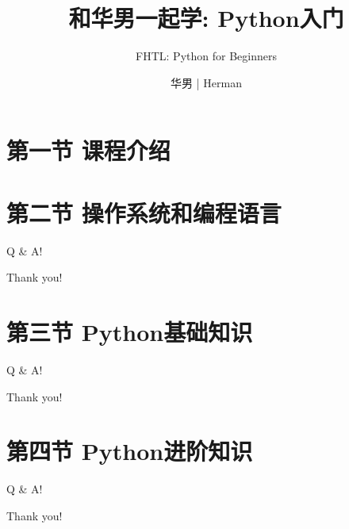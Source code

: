 \documentclass{beamer}
\title{
    和华男一起学: Python入门
    }
\subtitle{
    FHTL: Python for Beginners
    }
\date{}
\author{华男 | Herman}
\institute{\color{gray}{Follow Herman to Learn (FHTL)}}
\begin{document}
\maketitle

\section{第一节 \space 课程介绍}

\section{第二节 \space 操作系统和编程语言} %
\begin{frame}[standout] Q \& A! \end{frame}
\begin{frame}[standout] Thank you! \end{frame}

\section{第三节 \space Python基础知识} %






\begin{frame}[standout] Q \& A! \end{frame}
\begin{frame}[standout] Thank you! \end{frame}

\section{第四节 \space Python进阶知识}







\begin{frame}[standout] Q \& A! \end{frame}
\begin{frame}[standout] Thank you! \end{frame}
\end{document}
